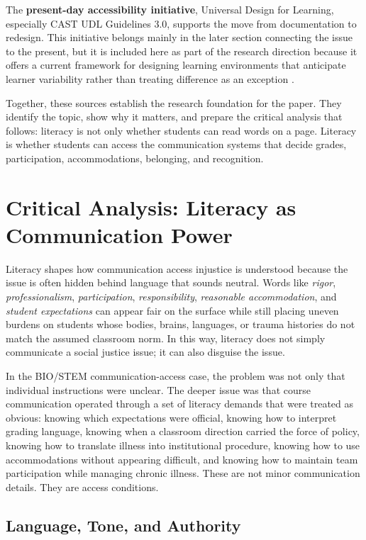 The \textbf{present-day accessibility initiative}, Universal Design for Learning, especially CAST UDL Guidelines 3.0, supports the move from documentation to redesign. This initiative belongs mainly in the later section connecting the issue to the present, but it is included here as part of the research direction because it offers a current framework for designing learning environments that anticipate learner variability rather than treating difference as an exception \citep{cast2024udl}.

Together, these sources establish the research foundation for the paper. They identify the topic, show why it matters, and prepare the critical analysis that follows: literacy is not only whether students can read words on a page. Literacy is whether students can access the communication systems that decide grades, participation, accommodations, belonging, and recognition.

\section*{Critical Analysis: Literacy as Communication Power}

Literacy shapes how communication access injustice is understood because the issue is often hidden behind language that sounds neutral. Words like \textit{rigor}, \textit{professionalism}, \textit{participation}, \textit{responsibility}, \textit{reasonable accommodation}, and \textit{student expectations} can appear fair on the surface while still placing uneven burdens on students whose bodies, brains, languages, or trauma histories do not match the assumed classroom norm. In this way, literacy does not simply communicate a social justice issue; it can also disguise the issue.

In the BIO/STEM communication-access case, the problem was not only that individual instructions were unclear. The deeper issue was that course communication operated through a set of literacy demands that were treated as obvious: knowing which expectations were official, knowing how to interpret grading language, knowing when a classroom direction carried the force of policy, knowing how to translate illness into institutional procedure, knowing how to use accommodations without appearing difficult, and knowing how to maintain team participation while managing chronic illness. These are not minor communication details. They are access conditions.

\subsection*{Language, Tone, and Authority}

